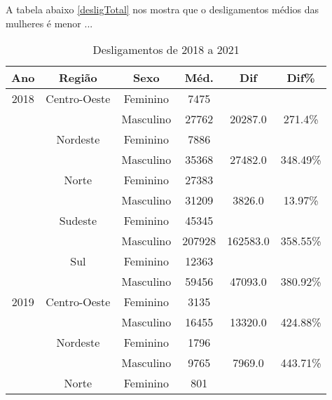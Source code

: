 A tabela abaixo \ref{desligTotal} nos mostra que o desligamentos médios das mulheres é menor ...

\begin{table}[htbp]
	\caption{Desligamentos de 2018 a 2021}
	\begin{center}
		\begin{tabular}{|c|c|c|c|c|c|}
			\hline
			\textbf{Ano} & \textbf{Região} & \textbf{Sexo} & \textbf{Méd.} & \textbf{Dif} & \textbf{Dif\%} \\ 
			\hline																			
			2018         & Centro-Oeste     & Feminino      & 7475           &              &                \\
			             &                  & Masculino     & 27762          & 20287.0      & 271.4\%        \\
			             & Nordeste         & Feminino      & 7886           &              &                \\
			             &                  & Masculino     & 35368          & 27482.0      & 348.49\%       \\
			             & Norte            & Feminino      & 27383          &              &                \\
			             &                  & Masculino     & 31209          & 3826.0       & 13.97\%        \\
			             & Sudeste          & Feminino      & 45345          &              &                \\
			             &                  & Masculino     & 207928         & 162583.0     & 358.55\%       \\
			             & Sul              & Feminino      & 12363          &              &                \\
			             &                  & Masculino     & 59456          & 47093.0      & 380.92\%       \\\hline
			2019         & Centro-Oeste     & Feminino      & 3135           &              &                \\
			             &                  & Masculino     & 16455          & 13320.0      & 424.88\%       \\
			             & Nordeste         & Feminino      & 1796           &              &                \\
			             &                  & Masculino     & 9765           & 7969.0       & 443.71\%       \\
			             & Norte            & Feminino      & 801            &              &                \\

\end{tabular}
\end{center}
\end{table}
